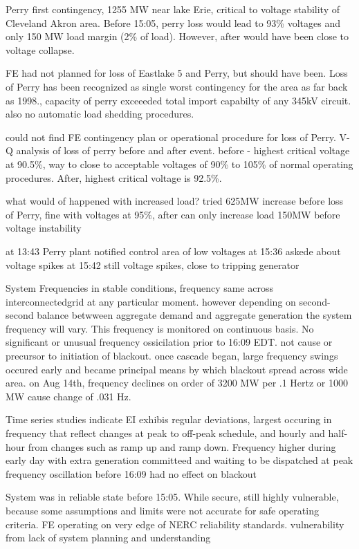Perry first contingency, 1255 MW near lake Erie, critical to voltage stability of Cleveland Akron area.  Before 15:05, perry loss would lead to 93\% voltages and only 150 MW load margin (2\% of load).  However, after would have been close to voltage collapse.

FE had not planned for loss of Eastlake 5 and Perry, but should have been.  Loss of Perry has been recognized as single worst contingency for the area as far back as 1998., capacity of perry exceeeded total import capabilty of any 345kV circuit.  also no automatic load shedding procedures.

could not find FE contingency plan or operational procedure for loss of Perry.  V-Q analysis of loss of perry before and after event.
before - highest critical voltage at 90.5\%, way to close to acceptable voltages of 90\% to 105\% of normal operating procedures.  After, highest critical voltage is 92.5\%.

what would of happened with increased load?
tried 625MW increase
before loss of Perry, fine with voltages at 95\%,
after can only increase load 150MW before voltage instability

at 13:43 Perry plant notified control area of low voltages
at 15:36 askede about voltage spikes
at 15:42 still voltage spikes, close to tripping generator

System Frequencies
in stable conditions, frequency same across interconnectedgrid at any particular moment.  however depending on second-second balance betwween aggregate demand and aggregate generation the system frequency will vary.  This frequency is monitored on continuous basis.  No significant or unusual frequency ossicilation prior to 16:09 EDT.  not cause or precursor to initiation of blackout.  once cascade began, large frequency swings occured early and became principal means by which blackout spread across wide area.
on Aug 14th, frequency declines on order of 3200 MW per .1 Hertz or 1000 MW cause change of .031 Hz.

Time series studies indicate EI exhibis regular deviations, largest occuring in frequency that reflect changes at peak to off-peak schedule, and hourly and half-hour from changes such as ramp up and ramp down.  Frequency higher during early day with extra generation committeed and waiting to be dispatched at peak
frequency oscillation before 16:09 had no effect on blackout

System was in reliable state before 15:05.  While secure, still highly vulnerable, because some assumptions and limits were not accurate for safe operating criteria.  FE operating on very edge of NERC reliability standards.  vulnerability from lack of system planning and understanding

